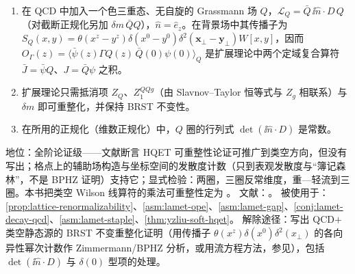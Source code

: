 \begin{assumption}\label{asm:lamet-aux-renorm}
\begin{enumerate}[label=(AX\arabic*),leftmargin=3.2em,itemsep=1pt,topsep=2pt]
\item 在 QCD 中加入一个色三重态、无自旋的 Grassmann 场 $Q$，$\mathcal L_Q=\bar Q\,\ii\hat n\cdot D\,Q$（对截断正规化另加 $\delta m\,\bar QQ$），$\hat n=\hat e_z$。在背景场中其传播子为 $S_Q(x,y)=\theta(x^z-y^z)\delta(x^0-y^0)\delta^2(\mathbf x_\perp-\mathbf y_\perp)W[x,y]$，因而 $O_\Gamma(z)=\langle\bar\psi(z)\Gamma Q(z)\,\bar Q(0)\psi(0)\rangle_Q$ 是扩展理论中两个定域复合算符 $\bar J=\bar\psi Q$、$J=\bar Q\psi$ 之积。
\item 扩展理论只需抵消项 $Z_Q$、$Z_1^{QQg}$（由 Slavnov--Taylor 恒等式与 $Z_g$ 相联系）与 $\delta m$ 即可重整化，并保持 BRST 不变性。
\item 在所用的正规化（维数正规化）中，$Q$ 圈的行列式 $\det(\ii\hat n\cdot D)$ 是常数。
\end{enumerate}
地位：全阶论证级——文献\cite{Ji:2017oey}断言 HQET 可重整性论证可推广到类空方向，但没有写出；格点上的辅助场构造\cite{Green:2017xeu}与坐标空间的发散度计数\cite{Ishikawa:2017faj}（只到表观发散度与“簿记森林”，不是 BPHZ 证明）支持它；显式检验：两圈\cite{Ji:2015jwa}，三圈反常维度\cite{Braun:2020ymy}，重—轻流到三圈\cite{Chetyrkin:2003vi}。本书把类空 Wilson 线算符的乘法可重整性定为 \tagA。
文献：\cite{Ji:2017oey,Green:2017xeu,Ishikawa:2017faj,Dorn:1986dt,Dotsenko:1979wb,Braun:2020ymy,Chetyrkin:2003vi}。
被使用于：\cref{prop:lattice-renormalizability}、\cref{asm:lamet-ope}、\cref{asm:lamet-gap}、\cref{conj:lamet-decay-qcd}、\cref{asm:lamet-staple}、\cref{thm:yzliu-soft-hqet}。
解除途径：写出 QCD$+$类空静态源的 BRST 不变重整化证明（用传播子 $\theta(x^z)\delta(x^0)\delta^2(x_\perp)$ 的各向异性幂次计数作 Zimmermann/BPHZ 分析，或用流方程方法，参见\cite{Frob:2015uqy}），包括 $\det(\ii\hat n\cdot D)$ 与 $\delta(0)$ 型项的处理。
\end{assumption}

